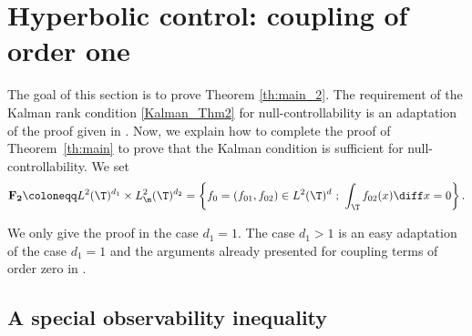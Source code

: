 \section{Hyperbolic control: coupling of order one} \label{Sec:Hyp}

The goal of this section is to prove Theorem \ref{th:main_2}.
The requirement of the Kalman rank condition \eqref{Kalman_Thm2} for null-controllability is an adaptation of the proof given in . Now, we explain how to complete the proof of Theorem~\ref{th:main} to prove that the Kalman condition is sufficient for null-controllability. We set
\begin{equation}
\label{defInvQuant}
\mathbf{F_2} \coloneqq L^2(\T)^{d_1} \times L^2_\m(\T)^{d_2} = \left\{ f_0=(f_{01},f_{02}) \in L^2(\T)^d\ ;\ \int_{\T} f_{02}(x) \diff x = 0\right\}.
\end{equation}

We only give the proof in the case $d_1=1$. The case $d_1 >1$ is an easy adaptation of the case $d_1=1$ and the arguments already presented for coupling terms of order zero in .

\subsection{A special observability inequality}

